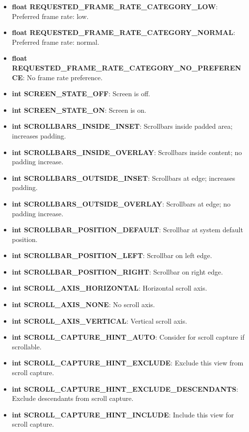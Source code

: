 \documentclass{report}
\begin{document}
\begin{itemize}
\begin{itemize}
                \item \textbf{float REQUESTED\_FRAME\_RATE\_CATEGORY\_LOW}: Preferred frame rate: low.
                \item \textbf{float REQUESTED\_FRAME\_RATE\_CATEGORY\_NORMAL}: Preferred frame rate: normal.
                \item \textbf{float REQUESTED\_FRAME\_RATE\_CATEGORY\_NO\_PREFERENCE}: No frame rate preference.
                \item \textbf{int SCREEN\_STATE\_OFF}: Screen is off.
                \item \textbf{int SCREEN\_STATE\_ON}: Screen is on.
                \item \textbf{int SCROLLBARS\_INSIDE\_INSET}: Scrollbars inside padded area; increases padding.
                \item \textbf{int SCROLLBARS\_INSIDE\_OVERLAY}: Scrollbars inside content; no padding increase.
                \item \textbf{int SCROLLBARS\_OUTSIDE\_INSET}: Scrollbars at edge; increases padding.
                \item \textbf{int SCROLLBARS\_OUTSIDE\_OVERLAY}: Scrollbars at edge; no padding increase.
                \item \textbf{int SCROLLBAR\_POSITION\_DEFAULT}: Scrollbar at system default position.
                \item \textbf{int SCROLLBAR\_POSITION\_LEFT}: Scrollbar on left edge.
                \item \textbf{int SCROLLBAR\_POSITION\_RIGHT}: Scrollbar on right edge.
                \item \textbf{int SCROLL\_AXIS\_HORIZONTAL}: Horizontal scroll axis.
                \item \textbf{int SCROLL\_AXIS\_NONE}: No scroll axis.
                \item \textbf{int SCROLL\_AXIS\_VERTICAL}: Vertical scroll axis.
                \item \textbf{int SCROLL\_CAPTURE\_HINT\_AUTO}: Consider for scroll capture if scrollable.
                \item \textbf{int SCROLL\_CAPTURE\_HINT\_EXCLUDE}: Exclude this view from scroll capture.
                \item \textbf{int SCROLL\_CAPTURE\_HINT\_EXCLUDE\_DESCENDANTS}: Exclude descendants from scroll capture.
                \item \textbf{int SCROLL\_CAPTURE\_HINT\_INCLUDE}: Include this view for scroll capture.

\end{itemize}
\end{itemize}
\end{document}
